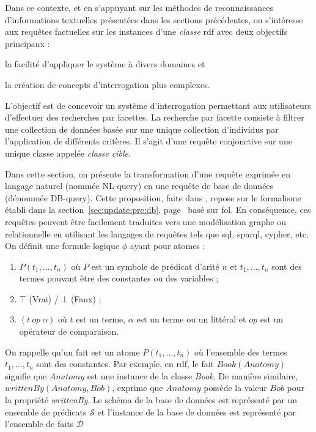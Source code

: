 Dans ce contexte, et en s'appuyant sur les méthodes de reconnaissances d'informations textuelles présentées dans les sections précédentes, on s'intéresse aux requêtes factuelles sur les instances d'une \emph{classe} \gls{rdf} avec deux objectifs principaux :
\begin{enumerate*}[label=(\roman*)]
    \item la facilité d'appliquer le système à divers domaines et
    \item la création de concepts d'interrogation plus complexes.
\end{enumerate*}
L'objectif est de concevoir un système d'interrogation permettant aux utilisateurs d'effectuer des recherches par facettes.
La recherche par facette consiste à filtrer une collection de données basée sur une unique collection d'individus par l'application de différents critères.
Il s'agit d'une requête conjonctive sur une unique classe appelée \emph{classe cible}.

Dans cette section, on présente la transformation d'une requête exprimée en langage naturel (nommée NL-query) en une requête de base de données (dénommée DB-query).
Cette proposition, faite dans \cite{amaviNaturalLanguageQuerying2020}, repose sur le formalisme établi dans la section~\ref{sec:update:pre:db}, page~\pageref{sec:update:pre:db} basé sur \gls{fol}.
En conséquence, ces requêtes peuvent être facilement traduites vers une modélisation graphe ou relationnelle en utilisant les langages de requêtes tels que \gls{sql}, \gls{sparql}, \gls{cypher}, etc.
On définit une formule logique $\phi$ ayant pour atomes :
\begin{enumerate}
    \item $P(t_1, \dots, t_n)$ où $P$ est un symbole de prédicat d'arité $n$ et $t_1, \dots, t_n$ sont des termes pouvant être des constantes ou des variables ;
    \item $\top$ (Vrai) / $\bot$ (Faux) ;
    \item $(t\ op\ \alpha)$ où $t$ est un terme, $\alpha$ est un terme ou un littéral et $op$ est un opérateur de comparaison.
\end{enumerate}
On rappelle qu'un fait est un atome $P(t_1, \dots, t_n)$ où l'ensemble des termes $t_1, \dots, t_n$ sont des constantes.
Par exemple, en \gls{rdf}, le fait $Book(Anatomy)$ signifie que $Anatomy$ est une instance de la classe \emph{Book}.
De manière similaire, $writtenBy(Anatomy, Bob)$, exprime que $Anatomy$ possède la valeur $Bob$ pour la propriété \textit{writtenBy}.
Le schéma de la base de données est représenté par un ensemble de prédicats $\mathcal{S}$ et l'instance de la base de données est représenté par l'ensemble de faits $\mathcal{D}$

